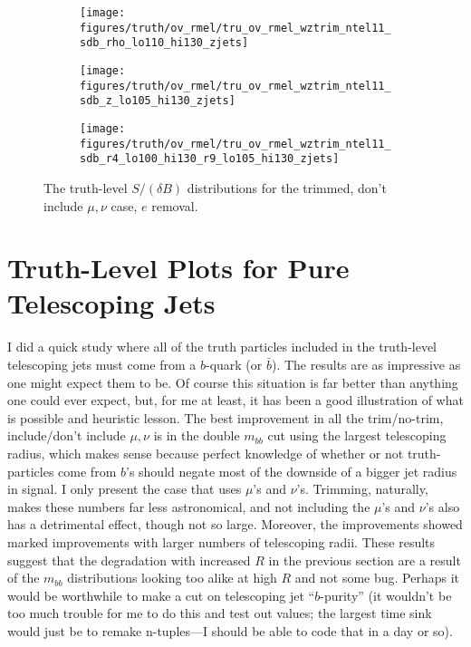 \begin{figure}[!htbp]\captionsetup{justification=centering}
\begin{center}
\begin{subfigure}[t]{18pc}\centering\texttt{[image: figures/truth/ov\_rmel/tru\_ov\_rmel\_wztrim\_ntel11\_sdb\_rho\_lo110\_hi130\_zjets]}\caption{}\end{subfigure}
\begin{subfigure}[t]{18pc}\centering\texttt{[image: figures/truth/ov\_rmel/tru\_ov\_rmel\_wztrim\_ntel11\_sdb\_z\_lo105\_hi130\_zjets]}\caption{}\end{subfigure}
\begin{subfigure}[t]{18pc}\centering\texttt{[image: figures/truth/ov\_rmel/tru\_ov\_rmel\_wztrim\_ntel11\_sdb\_r4\_lo100\_hi130\_r9\_lo105\_hi130\_zjets]}\caption{}\end{subfigure}
\caption{\label{fig:mbbwztrim}The truth-level $S/(\delta B)$ distributions for the trimmed, don't include $\mu,\nu$ case, $e$ removal.}
\end{center}
\end{figure}


\clearpage
\section{Truth-Level Plots for Pure Telescoping Jets}
I did a quick study where all of the truth particles included in the truth-level telescoping jets must come from a $b$-quark (or $\bar{b}$).  The results are as impressive as one might expect them to be. Of course this situation is far better than anything one could ever expect, but, for me at least, it has been a good illustration of what is possible and heuristic lesson.  The best improvement in all the trim/no-trim, include/don't include $\mu,\nu$ is in the double $m_{bb}$ cut using the largest telescoping radius, which makes sense because perfect knowledge of whether or not truth-particles come from $b$'s should negate most of the downside of a bigger jet radius in signal.  I only present the case that uses $\mu$'s and $\nu$'s.  Trimming, naturally, makes these numbers far less astronomical, and not including the $\mu$'s and $\nu$'s also has a detrimental effect, though not so large.  Moreover, the improvements showed marked improvements with larger numbers of telescoping radii.  These results suggest that the degradation with increased $R$ in the previous section are a result of the $m_{bb}$ distributions looking too alike at high $R$ and not some bug.  Perhaps it would be worthwhile to make a cut on telescoping jet ``$b$-purity'' (it wouldn't be too much trouble for me to do this and test out values; the largest time sink would just be to remake n-tuples---I should be able to code that in a day or so).

